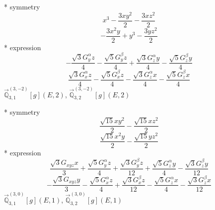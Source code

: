 \documentclass[fleqn,8pt]{jsarticle}
\begin{document}
\noindent\quad ** symmetry
\begin{dmath*}
x^{3} - \frac{3 x y^{2}}{2} - \frac{3 x z^{2}}{2}
\end{dmath*}
\begin{dmath*}
- \frac{3 x^{2} y}{2} + y^{3} - \frac{3 y z^{2}}{2}
\end{dmath*}
\noindent\quad ** expression
\begin{dmath*}
- \frac{\sqrt{3} G_{y}^{\alpha} z}{4} - \frac{\sqrt{5} G_{y}^{\beta} z}{4} + \frac{\sqrt{3} G_{z}^{\alpha} y}{4} - \frac{\sqrt{5} G_{z}^{\beta} y}{4}
\end{dmath*}
\begin{dmath*}
\frac{\sqrt{3} G_{x}^{\alpha} z}{4} - \frac{\sqrt{5} G_{x}^{\beta} z}{4} - \frac{\sqrt{3} G_{z}^{\alpha} x}{4} - \frac{\sqrt{5} G_{z}^{\beta} x}{4}
\end{dmath*}
\noindent\quad $\vec{\mathbb{Q}}_{3,1}^{(3,-2)}[g](E,2)$, $\vec{\mathbb{Q}}_{3,2}^{(3,-2)}[g](E,2)$

\noindent\quad ** symmetry
\begin{dmath*}
\frac{\sqrt{15} x y^{2}}{2} - \frac{\sqrt{15} x z^{2}}{2}
\end{dmath*}
\begin{dmath*}
\frac{\sqrt{15} x^{2} y}{2} - \frac{\sqrt{15} y z^{2}}{2}
\end{dmath*}
\noindent\quad ** expression
\begin{dmath*}
\frac{\sqrt{3} G_{xyz} x}{3} + \frac{\sqrt{5} G_{y}^{\alpha} z}{4} + \frac{\sqrt{3} G_{y}^{\beta} z}{12} + \frac{\sqrt{5} G_{z}^{\alpha} y}{4} - \frac{\sqrt{3} G_{z}^{\beta} y}{12}
\end{dmath*}
\begin{dmath*}
- \frac{\sqrt{3} G_{xyz} y}{3} - \frac{\sqrt{5} G_{x}^{\alpha} z}{4} + \frac{\sqrt{3} G_{x}^{\beta} z}{12} - \frac{\sqrt{5} G_{z}^{\alpha} x}{4} - \frac{\sqrt{3} G_{z}^{\beta} x}{12}
\end{dmath*}
\noindent\quad $\vec{\mathbb{Q}}_{3,1}^{(3,0)}[g](E,1)$, $\vec{\mathbb{Q}}_{3,2}^{(3,0)}[g](E,1)$
\end{document}
